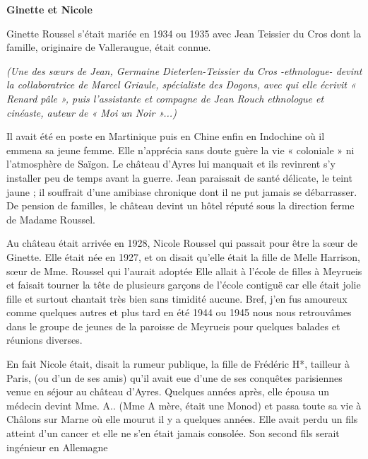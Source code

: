
\textbf{Ginette et Nicole}

\medskip

Ginette Roussel s’était mariée en 1934 ou 1935 avec Jean Teissier du Cros dont la famille,
originaire de Valleraugue, était connue.

\medskip

\textit{(Une des sœurs de Jean, Germaine Dieterlen-Teissier du Cros -ethnologue- devint la collaboratrice de Marcel
Griaule, spécialiste des Dogons, avec qui elle écrivit « Renard pâle », puis l’assistante et compagne de Jean
Rouch ethnologue et cinéaste, auteur de « Moi un Noir »...)}

\medskip

Il avait été en poste en Martinique puis en Chine enfin en Indochine où il emmena sa jeune
femme. Elle n’apprécia sans doute guère la vie « coloniale » ni l’atmosphère de Saïgon. Le
château d’Ayres lui manquait et ils revinrent s’y installer peu de temps avant la guerre. Jean
paraissait de santé délicate, le teint jaune ; il souffrait d’une amibiase chronique dont il ne put
jamais se débarrasser. De pension de familles, le château devint un hôtel réputé sous la
direction ferme de Madame Roussel.

\medskip

Au château était arrivée en 1928, Nicole Roussel qui passait pour être la sœur de Ginette. Elle
était née en 1927, et on disait qu’elle était la fille de Melle Harrison, sœur de Mme. Roussel
qui l’aurait adoptée Elle allait à l’école de filles à Meyrueis et faisait tourner la tête de
plusieurs garçons de l’école contiguë car elle était jolie fille et surtout chantait très bien sans
timidité aucune. Bref, j’en fus amoureux comme quelques autres et plus tard en été 1944 ou
1945 nous nous retrouvâmes dans le groupe de jeunes de la paroisse de Meyrueis pour
quelques balades et réunions diverses.

\medskip

En fait Nicole était, disait la rumeur publique, la fille de Frédéric H*, tailleur à Paris, (ou d’un
de ses amis) qu’il avait eue d’une de ses conquêtes parisiennes venue en séjour au château
d’Ayres. Quelques années après, elle épousa un médecin devint Mme. A.. (Mme A mère, était
une Monod) et passa toute sa vie à Châlons sur Marne où elle mourut il y a quelques années.
Elle avait perdu un fils atteint d’un cancer et elle ne s’en était jamais consolée. Son second fils
serait ingénieur en Allemagne

